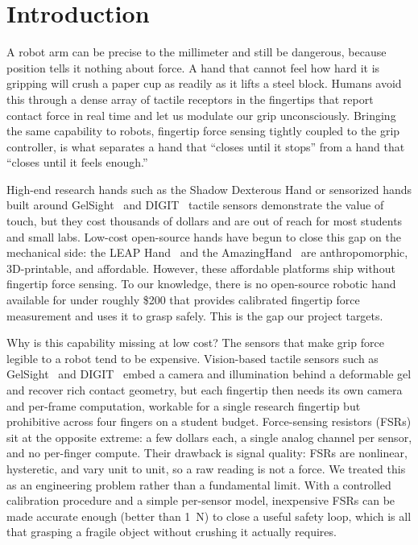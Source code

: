 \documentclass[acmlarge,screen,nonacm]{acmart}
\begin{document}
\section{Introduction}
A robot arm can be precise to the millimeter and still be dangerous, because
position tells it nothing about force. A hand that cannot feel how hard it is
gripping will crush a paper cup as readily as it lifts a steel block.
Humans avoid this through a dense array of tactile receptors in the fingertips
that report contact force in real time and let us modulate our grip
unconsciously. Bringing the same capability to robots, fingertip force
sensing tightly coupled to the grip controller, is what separates a hand that
``closes until it stops'' from a hand that ``closes until it feels enough.''

High-end research hands such as the Shadow Dexterous Hand or sensorized hands
built around GelSight~\cite{yuan2017gelsight} and DIGIT~\cite{lambeta2020digit}
tactile sensors demonstrate the value of touch, but they cost thousands of
dollars and are out of reach for most students and small labs.
Low-cost open-source hands have begun to close this gap on the mechanical side:
the LEAP Hand~\cite{shaw2023leap} and the AmazingHand~\cite{pollen2025amazinghand}
are anthropomorphic, 3D-printable, and affordable. However, these affordable
platforms ship without fingertip force sensing. To our knowledge, there is no
open-source robotic hand available for under roughly \$200 that provides
calibrated fingertip force measurement and uses it to grasp safely. This is the
gap our project targets.

Why is this capability missing at low cost? The sensors that make grip force
legible to a robot tend to be expensive. Vision-based tactile sensors such as
GelSight~\cite{yuan2017gelsight} and DIGIT~\cite{lambeta2020digit} embed a camera
and illumination behind a deformable gel and recover rich contact geometry, but
each fingertip then needs its own camera and per-frame computation, workable for
a single research fingertip but prohibitive across four fingers on a student budget.
Force-sensing resistors (FSRs) sit at the opposite extreme: a few dollars each, a
single analog channel per sensor, and no per-finger compute. Their drawback is
signal quality: FSRs are nonlinear, hysteretic, and vary unit to unit, so a raw
reading is not a force. We treated this as an engineering problem rather than a
fundamental limit. With a controlled calibration procedure and a simple
per-sensor model, inexpensive FSRs can be made accurate enough (better than
1~N) to close a useful safety loop, which is all that grasping a fragile object
without crushing it actually requires.
\end{document}
